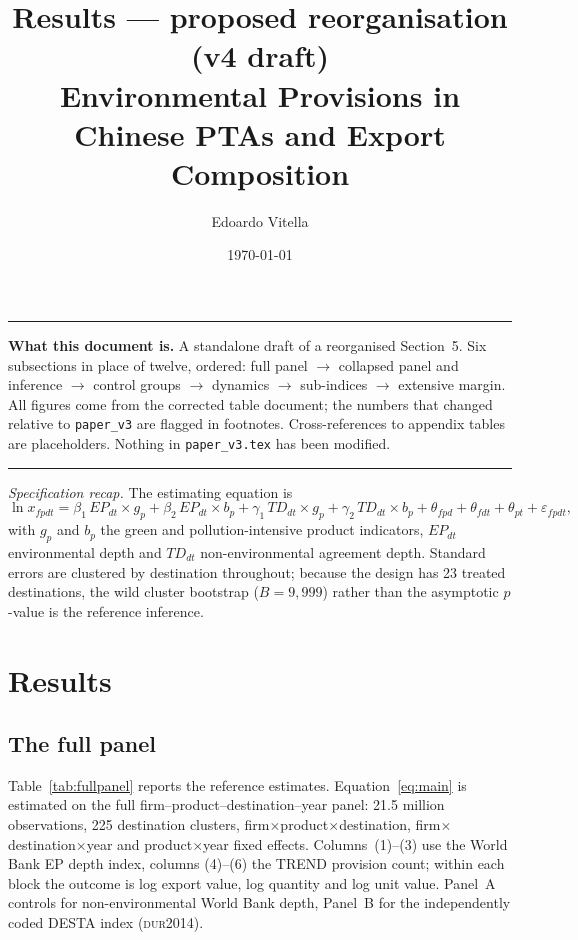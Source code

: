 \documentclass[11pt]{article}
\title{\textbf{Results --- proposed reorganisation (v4 draft)}\\[6pt]
\large Environmental Provisions in Chinese PTAs and Export Composition}
\author{Edoardo Vitella}
\date{\today}
\newcommand{\citep}[1]{(\textsc{#1})}
\begin{document}
\maketitle

\noindent\rule{\textwidth}{0.4pt}
\footnotesize
\textbf{What this document is.} A standalone draft of a reorganised Section~5. Six subsections in
place of twelve, ordered: full panel $\rightarrow$ collapsed panel and inference $\rightarrow$
control groups $\rightarrow$ dynamics $\rightarrow$ sub-indices $\rightarrow$ extensive margin.
All figures come from the corrected table document; the numbers that changed relative to
\texttt{paper\_v3} are flagged in footnotes. Cross-references to appendix tables are
placeholders. Nothing in \texttt{paper\_v3.tex} has been modified.
\normalsize
\noindent\rule{\textwidth}{0.4pt}

\vspace{12pt}
\noindent\emph{Specification recap.} The estimating equation is
\begin{equation}\label{eq:main}
\ln x_{fpdt} = \beta_1\, EP_{dt}\!\times\!g_p + \beta_2\, EP_{dt}\!\times\!b_p
+ \gamma_1\, TD_{dt}\!\times\!g_p + \gamma_2\, TD_{dt}\!\times\!b_p
+ \theta_{fpd} + \theta_{fdt} + \theta_{pt} + \varepsilon_{fpdt},
\end{equation}
with $g_p$ and $b_p$ the green and pollution-intensive product indicators, $EP_{dt}$ environmental
depth and $TD_{dt}$ non-environmental agreement depth. Standard errors are clustered by destination
throughout; because the design has 23 treated destinations, the wild cluster bootstrap
($B=9{,}999$) rather than the asymptotic $p$-value is the reference inference.

\section{Results}\label{sec:results}

\subsection{The full panel}\label{sec:fullpanel}

Table~\ref{tab:fullpanel} reports the reference estimates. Equation~\eqref{eq:main} is estimated on
the full firm--product--destination--year panel: 21.5 million observations, 225 destination
clusters, firm$\times$product$\times$destination, firm$\times$destination$\times$year and
product$\times$year fixed effects. Columns~(1)--(3) use the World Bank EP depth index, columns
(4)--(6) the TREND provision count; within each block the outcome is log export value, log
quantity and log unit value. Panel~A controls for non-environmental World Bank depth, Panel~B for
the independently coded DESTA index \citep{dur2014}.
\end{document}
